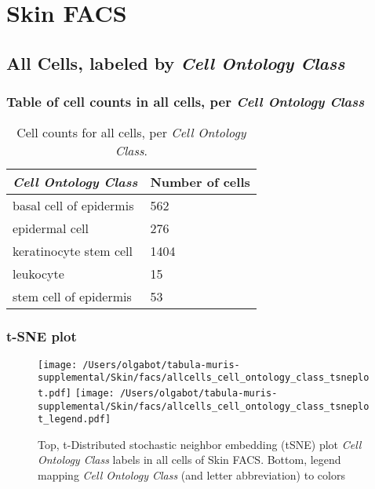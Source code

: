 \clearpage
\section{Skin FACS}

\subsection{All Cells, labeled by \emph{Cell Ontology Class}}
\subsubsection{Table of cell counts in all cells, per \emph{Cell Ontology Class}}\begin{table}[h]
\centering
\label{my-label}
\begin{tabular}{@{}ll@{}}
\toprule

\emph{Cell Ontology Class}& Number of cells \\ \midrule
basal cell of epidermis & 562 \\

epidermal cell & 276 \\

keratinocyte stem cell & 1404 \\

leukocyte & 15 \\

stem cell of epidermis & 53 \\
\bottomrule
\end{tabular}
\caption{Cell counts for all cells, per \emph{Cell Ontology Class}.}
\end{table}

\clearpage
\subsubsection{t-SNE plot}
\begin{figure}[h]
\centering
\texttt{[image: /Users/olgabot/tabula-muris-supplemental/Skin/facs/allcells\_cell\_ontology\_class\_tsneplot.pdf]}
\texttt{[image: /Users/olgabot/tabula-muris-supplemental/Skin/facs/allcells\_cell\_ontology\_class\_tsneplot\_legend.pdf]}
\caption{Top, t-Distributed stochastic neighbor embedding (tSNE) plot  \emph{Cell Ontology Class} labels in all cells of Skin FACS. Bottom, legend mapping \emph{Cell Ontology Class} (and letter abbreviation) to colors}
\end{figure}


\clearpage

